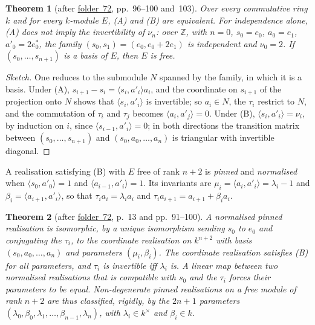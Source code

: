 \documentclass[11pt,a4paper]{amsart}
\newtheorem{theorem}{Theorem}[section]
\theoremstyle{definition}
\theoremstyle{remark}
\newcommand{\Z}{\mathbb Z}
\newcommand{\fac}[1]{\href{https://grothendieck.umontpellier.fr/#1.pdf}{folder~#1}}
\begin{document}
\begin{theorem}[after \fac{72}, pp.~96--100 and~103]\label{thm:AB}
Over every commutative ring $k$ and for every $k$-module $E$, (A) and (B) are equivalent. For independence alone, (A) does not imply the invertibility of $\nu_n$: over $\Z$, with $n = 0$, $s_0 = e_0$, $a_0 = e_1$, $a'_0 = 2e_0^*$, the family $(s_0, s_1) = (e_0, e_0 + 2e_1)$ is independent and $\nu_0 = 2$. If $(s_0, \dots, s_{n+1})$ is a basis of $E$, then $E$ is free.
\end{theorem}

\begin{proof}[Sketch]
One reduces to the submodule $N$ spanned by the family, in which it is a basis. Under (A), $s_{i+1} - s_i = \langle s_i, a'_i\rangle a_i$, and the coordinate on $s_{i+1}$ of the projection onto $N$ shows that $\langle s_i, a'_i\rangle$ is invertible; so $a_i \in N$, the $\tau_i$ restrict to $N$, and the commutation of $\tau_i$ and $\tau_j$ becomes $\langle a_i, a'_j\rangle = 0$. Under (B), $\langle s_i, a'_i\rangle = \nu_i$, by induction on $i$, since $\langle s_{i-1}, a'_i\rangle = 0$; in both directions the transition matrix between $(s_0, \dots, s_{n+1})$ and $(s_0, a_0, \dots, a_n)$ is triangular with invertible diagonal.
\end{proof}

A realisation satisfying (B) with $E$ free of rank $n+2$ is \emph{pinned} and \emph{normalised} when $\langle s_0, a'_0\rangle = 1$ and $\langle a_{i-1}, a'_i\rangle = 1$. Its invariants are $\mu_i = \langle a_i, a'_i\rangle = \lambda_i - 1$ and $\beta_i = \langle a_{i+1}, a'_i\rangle$, so that $\tau_ia_i = \lambda_ia_i$ and $\tau_ia_{i+1} = a_{i+1} + \beta_ia_i$.

\begin{theorem}[after \fac{72}, p.~13 and pp.~91--100]\label{thm:classif}
A normalised pinned realisation is isomorphic, by a unique isomorphism sending $s_0$ to $e_0$ and conjugating the $\tau_i$, to the coordinate realisation on $k^{n+2}$ with basis $(s_0, a_0, \dots, a_n)$ and parameters $(\mu_i, \beta_i)$. The coordinate realisation satisfies (B) for all parameters, and $\tau_i$ is invertible iff $\lambda_i$ is. A linear map between two normalised realisations that is compatible with $s_0$ and the $\tau_i$ forces their parameters to be equal. Non-degenerate pinned realisations on a free module of rank $n+2$ are thus classified, rigidly, by the $2n+1$ parameters $(\lambda_0, \beta_0, \lambda_1, \dots, \beta_{n-1}, \lambda_n)$, with $\lambda_i \in k^\times$ and $\beta_i \in k$.
\end{theorem}
\end{document}
